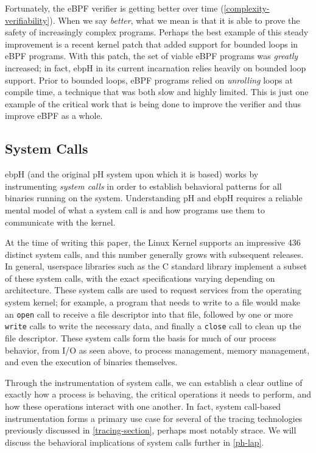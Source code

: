 \documentclass[
  12pt]{findlay}
\begin{document}
Fortunately, the eBPF verifier is getting better over time
(\autoref{complexity-verifiability}). When we say \emph{better}, what we
mean is that it is able to prove the safety of increasingly complex
programs. Perhaps the best example of this steady improvement is a
recent kernel patch \autocite{starovoitov19} that added support for
bounded loops in eBPF programs. With this patch, the set of viable eBPF
programs was \emph{greatly} increased; in fact, ebpH in its current
incarnation relies heavily on bounded loop support. Prior to bounded
loops, eBPF programs relied on \emph{unrolling} loops at compile time, a
technique that was both slow and highly limited. This is just one
example of the critical work that is being done to improve the verifier
and thus improve eBPF as a whole.

\hypertarget{system-calls}{%
\subsection{System Calls}\label{system-calls}}

ebpH (and the original pH system upon which it is based) works by
instrumenting \emph{system calls} in order to establish behavioral
patterns for all binaries running on the system. Understanding pH and
ebpH requires a reliable mental model of what a system call is and how
programs use them to communicate with the kernel.

At the time of writing this paper, the Linux Kernel \autocite{unistd}
supports an impressive 436 distinct system calls, and this number
generally grows with subsequent releases. In general, userspace
libraries such as the C standard library implement a subset of these
system calls, with the exact specifications varying depending on
architecture. These system calls are used to request services from the
operating system kernel; for example, a program that needs to write to a
file would make an \passthrough{\lstinline!open!} call to receive a file
descriptor into that file, followed by one or more
\passthrough{\lstinline!write!} calls to write the necessary data, and
finally a \passthrough{\lstinline!close!} call to clean up the file
descriptor. These system calls form the basis for much of our process
behavior, from I/O as seen above, to process management, memory
management, and even the execution of binaries themselves.

Through the instrumentation of system calls, we can establish a clear
outline of exactly how a process is behaving, the critical operations it
needs to perform, and how these operations interact with one another. In
fact, system call-based instrumentation forms a primary use case for
several of the tracing technologies previously discussed in
\autoref{tracing-section}, perhaps most notably strace. We will discuss
the behavioral implications of system calls further in \autoref{ph-lap}.
\end{document}
